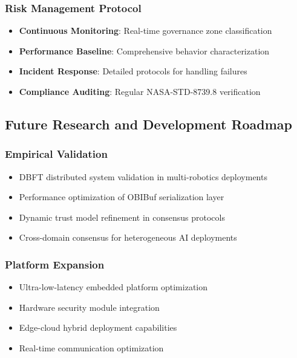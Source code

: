 \documentclass[12pt,a4paper]{article}
\begin{document}
\subsubsection{Risk Management Protocol}

\begin{itemize}
    \item \textbf{Continuous Monitoring}: Real-time governance zone classification
    \item \textbf{Performance Baseline}: Comprehensive behavior characterization
    \item \textbf{Incident Response}: Detailed protocols for handling failures
    \item \textbf{Compliance Auditing}: Regular NASA-STD-8739.8 verification
\end{itemize}

\subsection{Future Research and Development Roadmap}

\subsubsection{Empirical Validation}

\begin{itemize}
    \item DBFT distributed system validation in multi-robotics deployments
    \item Performance optimization of OBIBuf serialization layer
    \item Dynamic trust model refinement in consensus protocols
    \item Cross-domain consensus for heterogeneous AI deployments
\end{itemize}

\subsubsection{Platform Expansion}

\begin{itemize}
    \item Ultra-low-latency embedded platform optimization
    \item Hardware security module integration
    \item Edge-cloud hybrid deployment capabilities
    \item Real-time communication optimization
\end{itemize}
\end{document}
